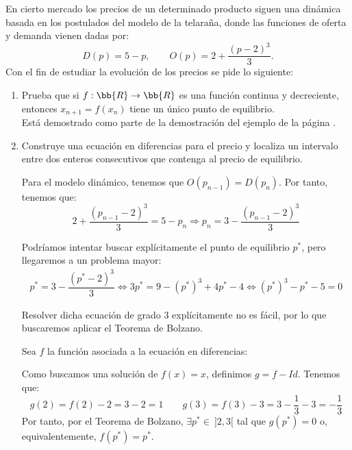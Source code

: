 \begin{ejercicio}
    En cierto mercado los precios de un determinado producto siguen una dinámica basada en los postulados del modelo de la telaraña, donde las funciones de oferta y demanda vienen dadas por:
    \begin{equation*}
        D(p)=5-p,\qquad O(p)=2+\frac{(p-2)^3}{3}.
    \end{equation*}
    Con el fin de estudiar la evolución de los precios se pide lo siguiente:
    \begin{enumerate}
        \item Prueba que si $f: \bb{R} \to \bb{R}$ es una función continua y decreciente, entonces $x_{n+1} = f(x_n)$ tiene un único punto de equilibrio.\\

        Está demostrado como parte de la demostración del ejemplo de la página \pageref{ej:decreciente_cont}.
        
        \item Construye una ecuación en diferencias para el precio y localiza un intervalo entre dos enteros consecutivos que contenga al precio de equilibrio.

        Para el modelo dinámico, tenemos que $O(p_{n-1})=D(p_n)$. Por tanto, tenemos que:
        \begin{equation*}
            2 + \dfrac{(p_{n-1}-2)^3}{3} = 5-p_n \Longrightarrow
            p_n = 3 - \dfrac{(p_{n-1}-2)^3}{3}
        \end{equation*}
        
        Podríamos intentar buscar explícitamente el punto de equilibrio $p^\ast$, pero llegaremos a un problema mayor:
        \begin{multline*}
            p^\ast = 3 - \dfrac{(p^\ast-2)^3}{3}
            \Longleftrightarrow
            3p^\ast = 9 -(p^\ast)^3 + 4p^\ast - 4
            \Longleftrightarrow
            (p^\ast)^3 - p^\ast - 5 = 0
        \end{multline*}

        Resolver dicha ecuación de grado $3$ explícitamente no es fácil, por lo que buscaremos aplicar el Teorema de Bolzano.

        Sea $f$ la función asociada a la ecuación en diferencias:

        Como buscamos una solución de $f(x)=x$, definimos $g=f-Id$. Tenemos que:
        \begin{equation*}
            g(2) = f(2)-2 = 3-2=1 \qquad g(3) = f(3)-3 = 3-\frac{1}{3} -3 = -\frac{1}{3}
        \end{equation*}
        Por tanto, por el Teorema de Bolzano, $\exists p^\ast\in~]2,3[$ tal que $g(p^\ast)=0$ o, equivalentemente, $f(p^\ast) = p^\ast$.
        

\end{enumerate}
\end{ejercicio}
